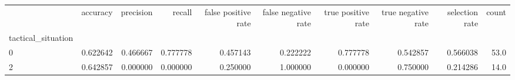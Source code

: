 \begin{tabular}{lrrrrrrrrr}
\toprule
{} &  accuracy &  precision &    recall &  false positive rate &  false negative rate &  true positive rate &  true negative rate &  selection rate &  count \\
tactical\_situation &           &            &           &                      &                      &                     &                     &                 &        \\
\midrule
0                  &  0.622642 &   0.466667 &  0.777778 &             0.457143 &             0.222222 &            0.777778 &            0.542857 &        0.566038 &   53.0 \\
2                  &  0.642857 &   0.000000 &  0.000000 &             0.250000 &             1.000000 &            0.000000 &            0.750000 &        0.214286 &   14.0 \\
\bottomrule
\end{tabular}
